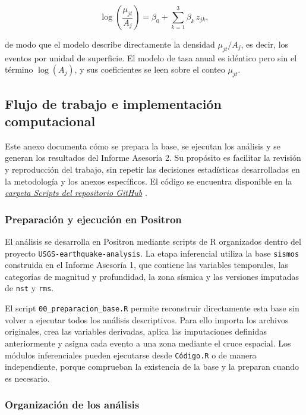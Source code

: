 \documentclass[
  spanish,
  letterpaper,
  DIV=11,
  numbers=noendperiod]{scrartcl}
\newcommand{\asesoriaExternalLink}[2]{%
  {\hypersetup{urlcolor=asesoriaLinkColor}\href{#1}{\textcolor{asesoriaLinkColor}{\emph{#2}}}}%
}
\begin{document}
\[
\log\!\left(\frac{\mu_{jt}}{A_j}\right) = \beta_0 + \sum_{k=1}^{3}\beta_k\, z_{jk},
\]

de modo que el modelo describe directamente la densidad
\(\mu_{jt}/A_j\), es decir, los eventos por unidad de superficie. El
modelo de tasa anual es idéntico pero sin el término \(\log(A_j)\), y
sus coeficientes se leen sobre el conteo \(\mu_{jt}\).

\newpage

\subsection{Flujo de trabajo e implementación
computacional}\label{sec-anexo-flujo-trabajo}

Este anexo documenta cómo se prepara la base, se ejecutan los análisis y
se generan los resultados del Informe Asesoría 2. Su propósito es
facilitar la revisión y reproducción del trabajo, sin repetir las
decisiones estadísticas desarrolladas en la metodología y los anexos
específicos. El código se encuentra disponible en la
\asesoriaExternalLink{https://github.com/MariaJoseVN/USGS-earthquake-analysis/tree/main/Scripts}{carpeta Scripts del repositorio GitHub}.

\subsubsection{Preparación y ejecución en
Positron}\label{preparaciuxf3n-y-ejecuciuxf3n-en-positron}

El análisis se desarrolla en Positron mediante scripts de R organizados
dentro del proyecto \texttt{USGS-earthquake-analysis}. La etapa
inferencial utiliza la base \texttt{sismos} construida en el Informe
Asesoría 1, que contiene las variables temporales, las categorías de
magnitud y profundidad, la zona sísmica y las versiones imputadas de
\texttt{nst} y \texttt{rms}.

El script \texttt{00\_preparacion\_base.R} permite reconstruir
directamente esta base sin volver a ejecutar todos los análisis
descriptivos. Para ello importa los archivos originales, crea las
variables derivadas, aplica las imputaciones definidas anteriormente y
asigna cada evento a una zona mediante el cruce espacial. Los módulos
inferenciales pueden ejecutarse desde \texttt{Código.R} o de manera
independiente, porque comprueban la existencia de la base y la preparan
cuando es necesario.

\subsubsection{Organización de los
análisis}\label{organizaciuxf3n-de-los-anuxe1lisis}
\end{document}

